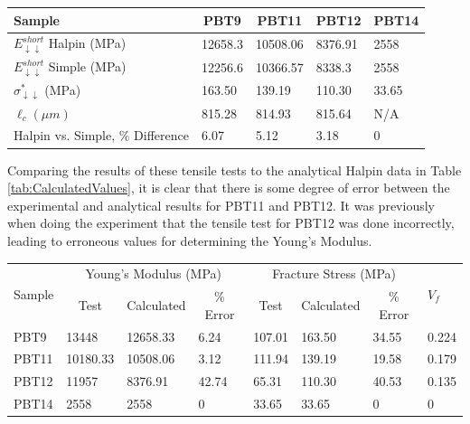 \documentclass[11pt]{article}
\begin{document}
\onehalfspacing
\begin{center}
 \label{tab:CalculatedValues}
\begin{tabular}{p{3.5cm} || p{} | p{} | p{} | p{}}
\hline
Sample & \multicolumn{1}{c|}{PBT9} & \multicolumn{1}{c|}{PBT11} & \multicolumn{1}{c|}{PBT12} & \multicolumn{1}{c}{PBT14} \\
\hline
\hline
\(E^{short}_{\downarrow \downarrow}\) Halpin (MPa)& 12658.3 &  10508.06 & 8376.91 & 2558\\
\(E^{short}_{\downarrow \downarrow}\) Simple (MPa)& 12256.6 & 10366.57 & 8338.3 & 2558\\
\(\sigma^*_{\downarrow \downarrow}\) (MPa)& 163.50 & 139.19 & 110.30 & 33.65\\
\(\ell_c (\mu m) \) & 815.28 & 814.93 & 815.64 & N/A\\
\hline
Halpin vs. Simple, \% Difference & 6.07 & 5.12 & 3.18 & 0\\
\hline
\end{tabular}
\end{center}
\singlespacing

Comparing the results of these tensile tests to the analytical Halpin data in Table \ref{tab:CalculatedValues}, it is clear that there is some degree of error between the experimental and analytical results for PBT11 and PBT12. It was previously when doing the experiment that the tensile test for PBT12 was done incorrectly, leading to erroneous values for determining the Young's Modulus.
\\
\bigskip
\onehalfspacing
\begin{center}
 \label{tab:ComparingValues}
\begin{tabular}{p{1.25cm} || p{1.5cm} | p{1.5cm} | p{1.5cm} | p{1.5cm} | p{1.5cm} | p{1.5cm} | p{1cm}}
\hline
 \multirow{2}{*}{Sample} & \multicolumn{3}{c|}{Young's Modulus (MPa)}  & 
   \multicolumn{3}{c|}{Fracture Stress (MPa)} & \multirow{2}{*}{\(V_f\)} \\
   & \multicolumn{1}{c}{Test} & \multicolumn{1}{c}{Calculated} & \multicolumn{1}{c|}{\% Error} & \multicolumn{1}{c}{Test} & \multicolumn{1}{c}{Calculated} & \multicolumn{1}{c|}{\% Error} &\\
\hline
PBT9 & 13448 & 12658.33 & 6.24 & 107.01 & 163.50 & 34.55 & 0.224\\
PBT11 & 10180.33 & 10508.06 & 3.12 & 111.94 & 139.19 & 19.58 & 0.179\\
PBT12 & 11957 & 8376.91 & 42.74 & 65.31 & 110.30 & 40.53 & 0.135 \\
PBT14 & 2558 & 2558 & 0 & 33.65 & 33.65 & 0 & 0\\
\hline
\end{tabular}
\end{center}
\singlespacing
\end{document}
